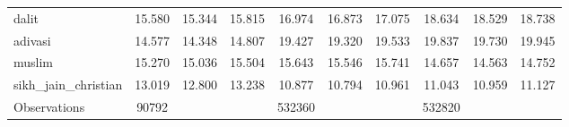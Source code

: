 {\begin{tabular}{l*{3}{ccc}}
dalit               &      15.580&      15.344&      15.815&      16.974&      16.873&      17.075&      18.634&      18.529&      18.738\\
adivasi             &      14.577&      14.348&      14.807&      19.427&      19.320&      19.533&      19.837&      19.730&      19.945\\
muslim              &      15.270&      15.036&      15.504&      15.643&      15.546&      15.741&      14.657&      14.563&      14.752\\
sikh\_jain\_christian &      13.019&      12.800&      13.238&      10.877&      10.794&      10.961&      11.043&      10.959&      11.127\\
\midrule
Observations        &       90792&            &            &      532360&            &            &      532820&            &            \\
\bottomrule
\end{tabular}
}
